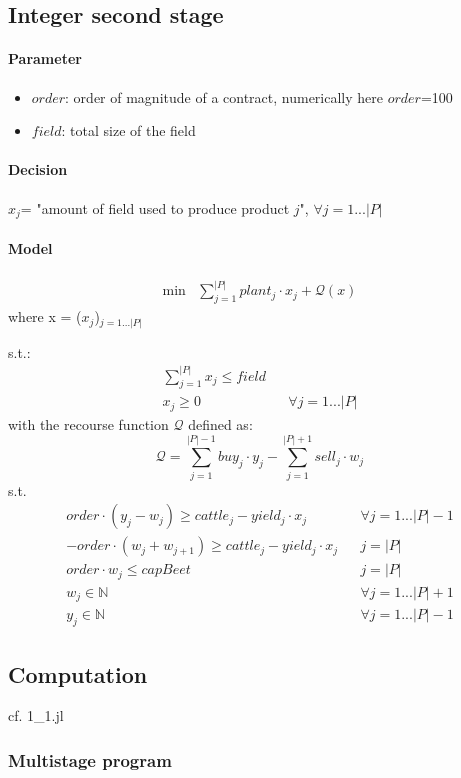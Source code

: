 \documentclass[12pt]{article}
\begin{document}
\subsection{Integer second stage}
\setcounter{equation}{0}
\paragraph{Parameter}
\begin{itemize}
	\item $order$: order of magnitude of a contract, numerically here $order$=100
	\item $field$: total size of the field
\end{itemize}
\paragraph{Decision}
$x_j$= "amount of field used to produce product $j$", $\forall j=1...|P|$
\paragraph{Model}
\begin{align}
	\text{min} & \sum\limits_{j=1}^{|P|} plant_j \cdot x_j + \mathcal{Q}(x)
\end{align}
where x = ($x_j$)$_{j = 1...|P|}$

s.t.:
\begin{align}
\sum\limits_{j=1}^{|P|} x_j\leq field & & \\
x_j \geq 0 & & \forall j=1...|P|
\end{align}
with the recourse function $\mathcal{Q}$ defined as:\\
\begin{equation}
\mathcal{Q} = \sum\limits_{j=1}^{|P|-1} buy_j \cdot y_j - \sum\limits_{j=1}^{|P|+1} sell_j \cdot w_j
\end{equation}
s.t.\\
\begin{align}
order \cdot (y_j - w_j) \geq cattle_j - yield_j \cdot x_j &  & \forall j=1...|P|-1\\
- order \cdot (w_j + w_{j+1}) \geq cattle_j - yield_j \cdot x_j & & j=|P|\\
order \cdot w_{j} \leq capBeet & & j=|P|\\
w_j \in \mathbb{N} & & \forall j=1...|P|+1\\
y_j \in \mathbb{N} & & \forall j=1...|P|-1
\end{align}

\subsection{Computation}
cf. 1\_1.jl

\subsubsection{Multistage program}
\end{document}
